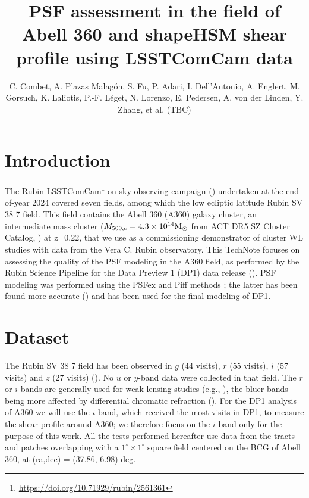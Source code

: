 \documentclass[SE,lsstdraft,authoryear,toc]{lsstdoc}
\title{PSF assessment in the field of Abell 360 and shapeHSM shear profile using LSSTComCam data}
\author{%
C. Combet, A. Plazas Malagón, S. Fu, P. Adari, I. Dell'Antonio, A. Englert, M. Gorsuch, K. Laliotis, P.-F. Léget, N. Lorenzo, E. Pedersen, A. von der Linden, Y. Zhang, et al. (TBC)
}
\date{\vcsDate}
\begin{document}
\maketitle

\section{Introduction}
The Rubin LSSTComCam\footnote{\url{https://doi.org/10.71929/rubin/2561361}} on-sky observing campaign ()
undertaken at the end-of-year 2024 covered seven fields, among which the low ecliptic latitude Rubin SV 38 7 field. This field contains the Abell 360 (A360) galaxy cluster, an intermediate mass cluster ($M_{500,c} = 4.3\times 10^{14} \rm{M}_\odot$ from ACT DR5 SZ Cluster Catalog, \citealp{2021ApJS..253....3H}) at z=0.22, that we use as a commissioning demonstrator of cluster WL studies with data from the Vera C. Rubin observatory. This TechNote focuses on assessing the quality of the PSF modeling in the A360 field, as performed by the Rubin Science Pipeline for the Data Preview 1 (DP1) data release (). PSF modeling was performed using the PSFex \citep{2011ASPC..442..435B} and Piff methods \citep{2021MNRAS.501.1282J}; the latter has been found more accurate () and has been used for the final modeling of DP1.

\section{Dataset}
The Rubin SV 38 7 field has been observed in $g$ (44 visits), $r$ (55 visits), $i$ (57 visits) and $z$ (27 visits) (). No $u$ or $y$-band data were collected in that field. The $r$ or $i$-bands are generally used for weak lensing studies (e.g., \citealp{2018MNRAS.481.3170M}), the bluer bands being more affected by differential chromatic refraction (). For the DP1 analysis of A360 we will use the $i$-band, which received the most visits in DP1, to measure the shear profile around A360; we therefore focus on the $i$-band only for the purpose of this work. All the tests performed hereafter use data from the tracts and patches overlapping with  a $1^\circ \times 1^\circ$ square field centered on the BCG of Abell 360, at (ra,dec) = (37.86, 6.98) deg. 
\end{document}
